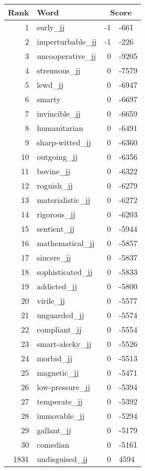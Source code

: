 \begin{longtable}[!htbp]{| rlr@{.}l |}
    \hline
    \textbf{Rank} & \textbf{Word} & \multicolumn{2}{c|}{\textbf{Score}} \\
    \hline
    \endhead
    1 & surly\_jj & -1 & -661 \\
    2 & imperturbable\_jj & -1 & -226 \\
    3 & uncooperative\_jj & 0 & -9205 \\
    4 & strenuous\_jj & 0 & -7579 \\
    5 & lewd\_jj & 0 & -6947 \\
    6 & smarty & 0 & -6697 \\
    7 & invincible\_jj & 0 & -6659 \\
    8 & humanitarian & 0 & -6491 \\
    9 & sharp-witted\_jj & 0 & -6360 \\
    10 & outgoing\_jj & 0 & -6356 \\
    11 & bovine\_jj & 0 & -6322 \\
    12 & roguish\_jj & 0 & -6279 \\
    13 & materialistic\_jj & 0 & -6272 \\
    14 & rigorous\_jj & 0 & -6203 \\
    15 & sentient\_jj & 0 & -5944 \\
    16 & mathematical\_jj & 0 & -5857 \\
    17 & sincere\_jj & 0 & -5837 \\
    18 & sophisticated\_jj & 0 & -5833 \\
    19 & addicted\_jj & 0 & -5800 \\
    20 & virile\_jj & 0 & -5577 \\
    21 & unguarded\_jj & 0 & -5574 \\
    22 & compliant\_jj & 0 & -5554 \\
    23 & smart-alecky\_jj & 0 & -5526 \\
    24 & morbid\_jj & 0 & -5513 \\
    25 & magnetic\_jj & 0 & -5471 \\
    26 & low-pressure\_jj & 0 & -5394 \\
    27 & temperate\_jj & 0 & -5392 \\
    28 & immovable\_jj & 0 & -5294 \\
    29 & gallant\_jj & 0 & -5179 \\
    30 & comedian & 0 & -5161 \\
    1831 & undisguised\_jj & 0 & 4594 \\

\end{longtable}
